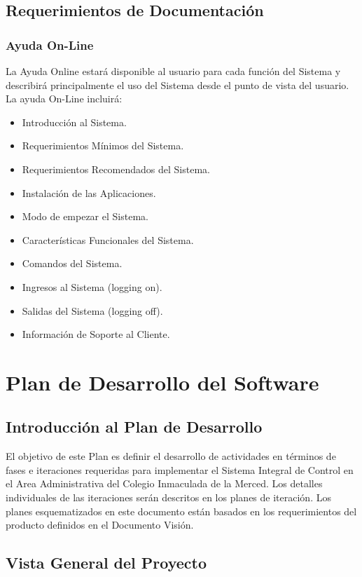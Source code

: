 \documentclass[a4paper,11pt, spanish]{report}
\begin{document}
{{{{{{{{        \subsection{Requerimientos de Documentación}
            \subsubsection {Ayuda On-Line}
                La Ayuda Online estará disponible al usuario para cada función del Sistema y describirá principalmente el uso del Sistema desde el punto de vista del usuario. La ayuda On-Line incluirá:
                \begin{itemize}
                \item Introducción al Sistema.
                \item Requerimientos Mínimos del Sistema.
                \item Requerimientos Recomendados del Sistema.
                \item Instalación de las Aplicaciones.
                \item Modo de empezar el Sistema.
                \item Características Funcionales del Sistema.
                \item Comandos del Sistema.
                \item Ingresos al Sistema (logging on).
                \item Salidas del Sistema (logging off).
                \item Información de Soporte al Cliente.
                \end{itemize}
    \section{Plan de Desarrollo del Software}
    \subsection{Introducción al Plan de Desarrollo}
        El objetivo de este Plan es definir el desarrollo de actividades en términos de fases e iteraciones requeridas para implementar el Sistema Integral de Control en el Area Administrativa del Colegio Inmaculada de la Merced. Los detalles individuales de las iteraciones serán descritos en los planes de iteración. Los planes esquematizados en este documento están basados en los requerimientos del producto definidos en el Documento Visión.
    \subsection{Vista General del Proyecto}
}}}}}}}}
\end{document}
